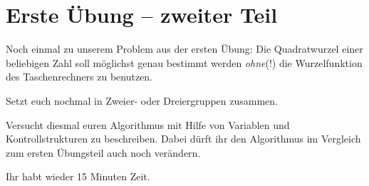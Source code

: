 \clearpage

\rehead[]{\textcolor{lightblue}{AvHG, Inf, My}}
\lohead[]{\textcolor{lightblue}{AvHG, Inf, My}}

\section{Erste Übung -- zweiter Teil}

Noch einmal zu unserem Problem aus der ersten Übung: Die Quadratwurzel einer
beliebigen Zahl soll möglichst genau bestimmt werden \emph{ohne}(!) die Wurzelfunktion des
Taschenrechners zu benutzen.

Setzt euch nochmal in Zweier- oder Dreiergruppen zusammen.

Versucht diesmal euren Algorithmus mit Hilfe von Variablen und
Kontrollstrukturen zu beschreiben. Dabei dürft ihr den Algorithmus im Vergleich
zum ersten Übungsteil auch noch verändern.

Ihr habt wieder 15 Minuten Zeit.
